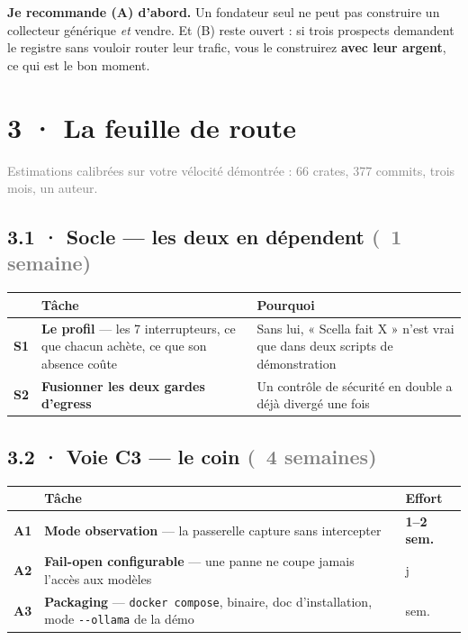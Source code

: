 \documentclass[10pt]{article}
\newcommand{\sz}[1]{\textcolor{grey}{\small\textsf{#1}}}
\newcommand{\code}[1]{\texttt{\small #1}}
\begin{document}
\begin{piste}
\textbf{Je recommande (A) d'abord.} Un fondateur seul ne peut pas construire un collecteur générique
\emph{et} vendre. Et (B) reste ouvert : si trois prospects demandent le registre sans vouloir router
leur trafic, vous le construirez \textbf{avec leur argent}, ce qui est le bon moment.
\end{piste}

\section{3 · La feuille de route}

\sz{Estimations calibrées sur votre vélocité démontrée : 66 crates, 377 commits, trois mois, un auteur.}

\subsection{3.1 · Socle --- les deux en dépendent \sz{(~1 semaine)}}

\renewcommand{\arraystretch}{1.2}
\begin{center}\small
\begin{tabular}{@{}c >{\raggedright\arraybackslash}p{5.6cm} >{\raggedright\arraybackslash}p{8.4cm}@{}}
\toprule
& \textbf{Tâche} & \textbf{Pourquoi} \\
\midrule
\textbf{S1} & \textbf{Le profil} --- les 7 interrupteurs, ce que chacun achète, ce que son absence coûte & Sans lui, « Scella fait X » n'est vrai que dans deux scripts de démonstration \\
\textbf{S2} & \textbf{Fusionner les deux gardes d'egress} & Un contrôle de sécurité en double a déjà divergé une fois \\
\bottomrule
\end{tabular}
\end{center}

\subsection{3.2 · Voie C3 --- le coin \sz{(~4 semaines)}}

\begin{center}\small
\begin{tabular}{@{}c >{\raggedright\arraybackslash}p{9.6cm} >{\centering\arraybackslash}p{2.2cm}@{}}
\toprule
& \textbf{Tâche} & \textbf{Effort} \\
\midrule
\textbf{A1} & \textbf{Mode observation} --- la passerelle capture sans intercepter & \textbf{1--2 sem.} \\
\textbf{A2} & \textbf{Fail-open configurable} --- une panne ne coupe jamais l'accès aux modèles & 3 j \\
\textbf{A3} & \textbf{Packaging} --- \code{docker compose}, binaire, doc d'installation, mode \code{-{}-ollama} de la démo & 1 sem. \\
\bottomrule
\end{tabular}
\end{center}
\end{document}
